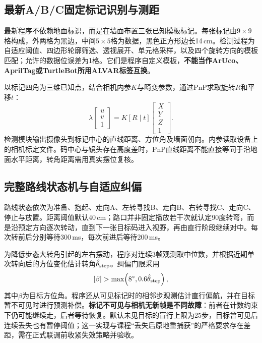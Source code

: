 \subsection{最新A/B/C固定标记识别与测距}
最新程序不依赖地面标识，而是在墙面布置三张已知模板标记。每张标记由$9\times9$格构成，外两格为黑边，中间$5\times5$格为数据，黑色正方形边长14\,cm。检测过程为自适应阈值、四边形轮廓筛选、透视展开、单元格采样，以及四个旋转方向的模板匹配；允许的数据位误差为1格。它们是程序自定义模板，\textbf{不能当作ArUco、AprilTag或TurtleBot所用ALVAR标签互换}。

以标记四角为三维已知点，结合相机内参$K$与畸变参数，通过PnP求取旋转$R$和平移$t$：
\begin{equation}
\lambda\begin{bmatrix}u\\v\\1\end{bmatrix}
=K\left[R\mid t\right]\begin{bmatrix}X\\Y\\Z\\1\end{bmatrix}.
\end{equation}
检测模块输出摄像头到标记中心的直线距离、方位角及墙面朝向。内参读取设备上的相机标定文件。码中心与镜头存在高度差时，PnP直线距离不能直接等同于沿地面水平距离，转角距离需用真实摆位复核。

\subsection{完整路线状态机与自适应纠偏}
路线状态依次为准备、抱起、走向A、左转寻找B、走向B、右转寻找C、走向C、停止与放置。距离阈值默认40\,cm；路口并非固定播放若干次就认定90度转弯，而是沿预定方向逐次转动，直到下一张目标码进入视野，再由直行阶段继续对中。每次转前后分别等待300\,ms，每次前进后等待200\,ms。

为降低步态大转角引起的左右摆动，程序对连续3帧观测取中位数，并根据近期单次转向后的方位变化估计转角$\hat\theta_{\rm step}$。纠偏门限采用
\begin{equation}
|\beta|>\max\!\left(8^\circ,0.6\hat\theta_{\rm step}\right),
\end{equation}
其中$\beta$为目标方位角。程序还从可见标记时的相邻步观测估计直行偏航，并在目标暂不可见时进行预测补偿。\textbf{标记不可见与相机无新帧是不同故障}：前者在计数约束下仍可能继续走，后者等待恢复。默认未见目标的盲行上限为25步，目标曾可见后连续丢失也有暂停阈值；这一实现与课程“丢失后原地重捕获”的严格要求存在差距，需在正式联调前收紧失效策略并验收。

